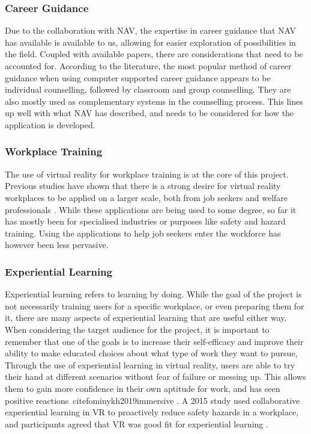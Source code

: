 \subsubsection{Career Guidance}
Due to the collaboration with NAV, the expertise in career guidance that NAV has available is available to us, allowing for easier exploration of possibilities in the field. Coupled with available papers, there are considerations that need to be accounted for. According to the literature, the most popular method of career guidance when using computer supported career guidance appears to be individual counselling, followed by classroom and group counselling. They are also mostly used as complementary systems in the counselling process\cite{sampson1987computer}. This lines up well with what NAV has described, and needs to be considered for how the application is developed. 



\subsubsection{Workplace Training}
The use of virtual reality for workplace training is at the core of this project. Previous studies have shown that there is a strong desire for virtual reality workplaces to be applied on a larger scale, both from job seekers and welfare professionals \cite{prasolova2019empowering}. While these applications are being used to some degree, so far it has mostly been for specialised industries or purposes like safety and hazard training. Using the applications to help job seekers enter the workforce has however been less pervasive. 

\subsubsection{Experiential Learning}
Experiential learning refers to learning by doing. While the goal of the project is not necessarily training users for a specific workplace, or even preparing them for it, there are many aspects of experiential learning that are useful either way. When considering the target audience for the project, it is important to remember that one of the goals is to increase their self-efficacy and improve their ability to make educated choices about what type of work they want to pursue, Through the use of experiential learning in virtual reality, users are able to try their hand at different scenarios without fear of failure or messing up. This allows them to gain more confidence in their own aptitude for work, and has seen positive reactions\ cite{fominykh2019immersive} \cite{prasolova2019empowering}. A 2015 study used collaborative experiential learning in VR to proactively reduce safety hazards in a workplace, and participants agreed that VR was good fit for experiential learning \cite{le2015social}.

